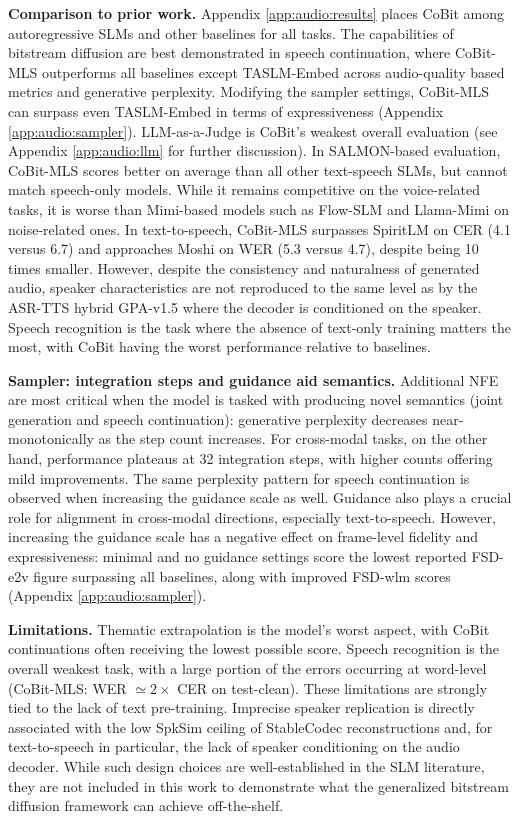 \textbf{Comparison to prior work.} Appendix \ref{app:audio:results} places CoBit among autoregressive SLMs and other baselines for all tasks. The capabilities of bitstream diffusion are best demonstrated in speech continuation, where CoBit-MLS outperforms all baselines except TASLM-Embed across audio-quality based metrics and generative perplexity. Modifying the sampler settings, CoBit-MLS can surpass even TASLM-Embed in terms of expressiveness (Appendix \ref{app:audio:sampler}).  LLM-as-a-Judge is CoBit's weakest overall evaluation (see Appendix \ref{app:audio:llm} for further discussion). In SALMON-based evaluation, CoBit-MLS scores better on average than all other text-speech SLMs, but cannot match speech-only models. While it remains competitive on the voice-related tasks, it is worse than Mimi-based models such as Flow-SLM and Llama-Mimi on noise-related ones. In text-to-speech, CoBit-MLS surpasses SpiritLM on CER (4.1 versus 6.7) and approaches Moshi on WER (5.3 versus 4.7), despite being 10 times smaller. However, despite the consistency and naturalness of generated audio, speaker characteristics are not reproduced to the same level as by the ASR-TTS hybrid GPA-v1.5 \citep{audio:gpa} where the decoder is conditioned on the speaker. Speech recognition is the task where the absence of text-only training matters the most, with CoBit having the worst performance relative to baselines.

\textbf{Sampler: integration steps and guidance aid semantics.} Additional NFE are most critical when the model is tasked with producing novel semantics (joint generation and speech continuation): generative perplexity decreases near-monotonically as the step count increases. For cross-modal tasks, on the other hand, performance plateaus at 32 integration steps, with higher counts offering mild improvements. The same perplexity pattern for speech continuation is observed when increasing the guidance scale as well. Guidance also plays a crucial role for alignment in cross-modal directions, especially text-to-speech. However, increasing the guidance scale has a negative effect on frame-level fidelity and expressiveness: minimal and no guidance settings score the lowest reported FSD-e2v figure surpassing all baselines, along with improved FSD-wlm scores (Appendix \ref{app:audio:sampler}).

\textbf{Limitations.} Thematic extrapolation is the model's worst aspect, with CoBit continuations often receiving the lowest possible score. Speech recognition is the overall weakest task, with a large portion of the errors occurring at word-level (CoBit-MLS: WER $\simeq2\times$ CER on test-clean). These limitations are strongly tied to the lack of text pre-training.  Imprecise speaker replication is directly associated with the low SpkSim ceiling of StableCodec reconstructions and, for text-to-speech in particular, the lack of speaker conditioning on the audio decoder. While such design choices are well-established in the SLM literature, they are not included in this work to demonstrate what the generalized bitstream diffusion framework can achieve off-the-shelf.
